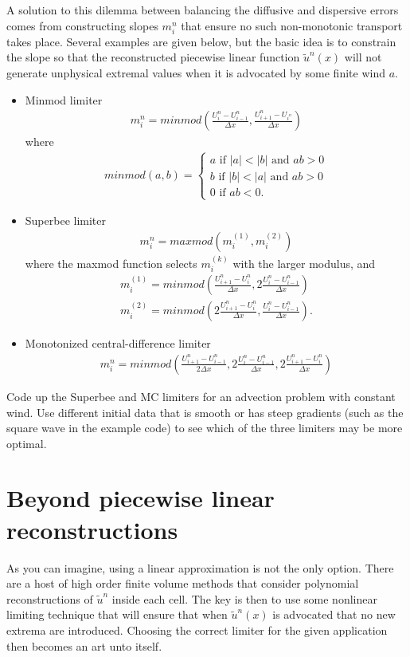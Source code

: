 A solution to this dilemma between balancing the diffusive and dispersive errors comes from constructing slopes $m_i^n$ that ensure no such non-monotonic transport takes place.  Several examples are given below, but the basic idea is to constrain the slope so that the reconstructed piecewise linear function $\tilde{u}^n(x)$ will not generate unphysical extremal values when it is advocated by some finite wind $a$.

\begin{itemize}
\item Minmod limiter
\begin{gather}
m_i^n = minmod\left(\frac{U_i^n-U_{i-1}^n}{\Delta x},\frac{U_{i+1}^n-U_{i^n}}{\Delta x}\right)
\end{gather}
where
\begin{gather}
minmod(a,b) = \left\{\begin{array}{ccc}a  \mbox{ if } |a| < |b|  \mbox{ and } ab>0\\
b  \mbox{ if } |b|<|a|  \mbox{ and } ab>0\\ 0  \mbox{ if } ab < 0 .\end{array}\right.
\end{gather}
\item Superbee limiter
\begin{gather}
m_i^n = maxmod(m^{(1)}_i,m^{(2)}_i)
\end{gather}
where the maxmod function selects $m^{(k)}_i$ with the larger modulus, and
\begin{gather}
m^{(1)}_i = minmod \left(\frac{U_{i+1}^n-U_i^n}{\Delta x},2\frac{U_i^n-U_{i-1}^n}{\Delta x}\right)\\
m^{(2)}_i = minmod \left( 2\frac{U_{i+1}^n-U_i^n}{\Delta x},\frac{U_i^n-U_{i-1}^n}{\Delta x}\right).
\end{gather}
\item Monotonized central-difference limiter
\begin{gather}
m_i^n = minmod\left(\frac{U_{i+1}^n-U_{i-1}^n}{2\Delta x},2\frac{U_i^n-U_{i-1}^n}{\Delta x},2\frac{U_{i+1}^n-U_i^n}{\Delta x}\right)
\end{gather}
\end{itemize}

\begin{problem}
Code up the Superbee and MC limiters for an advection problem with constant wind.  Use different initial data that is smooth or has steep gradients (such as the square wave in the example code) to see which of the three limiters may be more optimal.
\end{problem}

\section*{Beyond piecewise linear reconstructions}
As you can imagine, using a linear approximation is not the only option.  There are a host of high order finite volume methods that consider polynomial reconstructions of $\tilde{u}^n$ inside each cell.  The key is then to use some nonlinear limiting technique that will ensure that when $\tilde{u}^n(x)$ is advocated that no new extrema are introduced.  Choosing the correct limiter for the given application then becomes an art unto itself.